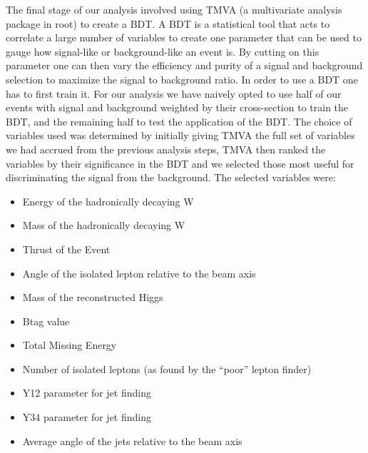 The final stage of our analysis involved using TMVA (a multivariate analysis package in root) to create a \ac{BDT}. A BDT is a statistical tool that acts to correlate a large number of variables to create one parameter that can be used to gauge how signal-like or background-like an event is. By cutting on this parameter one can then vary the efficiency and purity of a signal and background selection to maximize the signal to background ratio. In order to use a BDT one has to first train it. For our analysis we have naively opted to use half of our events with signal and background weighted by their cross-section to train the BDT, and the remaining half to test the application of the BDT. The choice of variables used was determined by initially giving TMVA the full set of variables we had accrued from the previous analysis steps, TMVA then ranked the variables by their significance in the BDT and we selected those most useful for discriminating the signal from the background. The selected variables were:

\begin{itemize}
  \item Energy of the hadronically decaying W
  \item Mass of the hadronically decaying W
  \item Thrust of the Event
  \item Angle of the isolated lepton relative to the beam axis
  \item Mass of the reconstructed Higgs
  \item Btag value
  \item Total Missing Energy 
  \item Number of isolated leptons (as found by the ``poor'' lepton finder)
  \item Y12 parameter for jet finding
  \item Y34 parameter for jet finding
  \item Average angle of the jets relative to the beam axis
\end{itemize}

